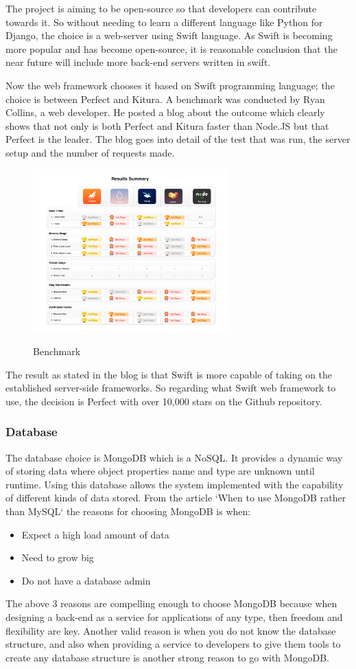 The project is aiming to be open-source so that developers can contribute towards it. So without needing to learn a different language like Python for Django, the choice is a web-server using Swift language. As Swift is becoming more popular and has become open-source, it is reasonable conclusion that the near future will include more back-end servers written in swift.

Now the web framework chooses it based on Swift programming language; the choice is between Perfect and Kitura. A benchmark was conducted by Ryan Collins, a web developer. He posted a blog about the outcome \cite{benchmark} which clearly shows that not only is both Perfect and Kitura faster than Node.JS but that Perfect is the leader. The blog goes into detail of the test that was run, the server setup and the number of requests made.

\begin{figure}[!h]
    \caption{Benchmark}
    \centering
    \includegraphics[width=75mm]{images/benchmarks}
    \label{fig:label}
\end{figure}

The result as stated in the blog is that Swift is more capable of taking on the established server-side frameworks. So regarding what Swift web framework to use, the decision is Perfect with over 10,000 stars on the Github repository. \cite{github1} 

\subsubsection{Database}
The database choice is MongoDB which is a NoSQL. It provides a dynamic way of storing data where object properties name and type are unknown until runtime. Using this database allows the system implemented with the capability of different kinds of data stored. From the article `When to use MongoDB rather than MySQL` \cite{database} the reasons for choosing MongoDB is when:
\begin{itemize}
  \item Expect a high load amount of data
  \item Need to grow big 
  \item Do not have a database admin
\end{itemize}
The above 3 reasons are compelling enough to choose MongoDB because when designing a back-end as a service for applications of any type, then freedom and flexibility are key. Another valid reason is when you do not know the database structure, and also when providing a service to developers to give them tools to create any database structure is another strong reason to go with MongoDB. 

